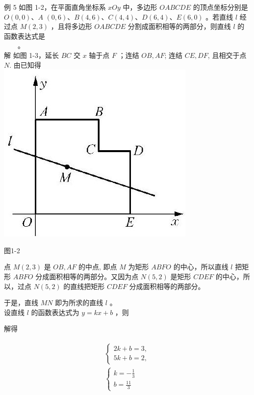 \documentclass[10pt]{article}
\begin{document}
例 5 如图 1-2，在平面直角坐标系 $x O y$ 中，多边形 $O A B C D E$ 的顶点坐标分别是 $O(0,0) 、 A$ $(0,6) 、 B(4,6) 、 C(4,4) 、 D(6,4) 、 E(6,0)$ 。若直线 $l$ 经过点 $M(2,3)$ ，且将多边形 $O A B C D E$ 分割成面积相等的两部分，则直线 $l$ 的函数表达式是\\
$\qquad$。\\
解 如图 1-3，延长 $B C$ 交 $x$ 轴于点 $F$ ；连结 $O B, A F$; 连结 $C E, D F$, 且相交于点 $N$. 由已知得\\
\includegraphics[max width=\textwidth, center]{2024_10_30_1bf34f7aeb61f11d11d3g-013}

图1-2

点 $M(2,3)$ 是 $O B, A F$ 的中点, 即点 $M$ 为矩形 $A B F O$ 的中心，所以直线 $l$ 把矩形 $A B F O$ 分成面积相等的两部分。又因为点 $N(5,2)$ 是矩形 $C D E F$ 的中心，所以，过点 $N(5,2)$ 的直线把矩形 $C D E F$ 分成面积相等的两部分。

于是，直线 $M N$ 即为所求的直线 $l$ 。\\
设直线 $l$ 的函数表达式为 $y=k x+b$ ，则

解得

\begin{align*}
\begin{gathered}
\left\{\begin{array}{l}
2 k+b=3, \\
5 k+b=2,
\end{array}\right. \\
\left\{\begin{array}{l}
k=-\frac{1}{3} \\
b=\frac{11}{3}
\end{array}\right.
\end{gathered}
\end{align*}
\end{document}
